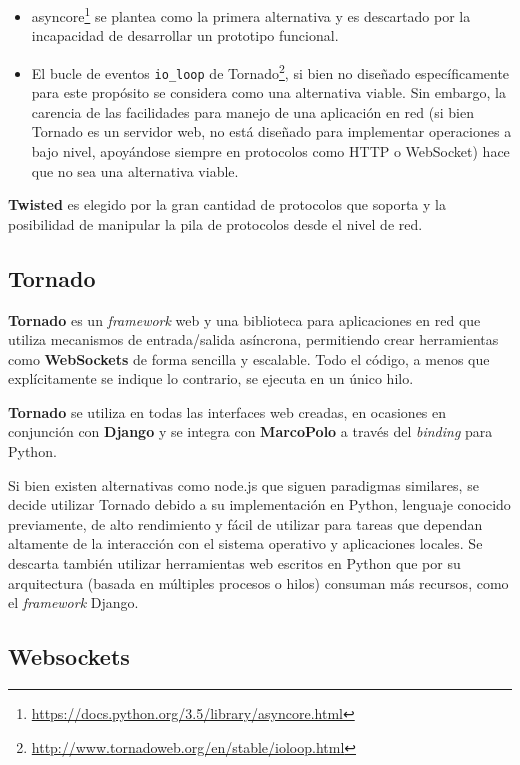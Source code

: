 \begin{itemize}
\item asyncore\footnote{\href{https://docs.python.org/3.5/library/asyncore.html}{https://docs.python.org/3.5/library/asyncore.html}} se plantea como la primera alternativa y es descartado por la incapacidad de desarrollar un prototipo funcional.
\item El bucle de eventos \texttt{io\_loop} de Tornado\footnote{\href{http://www.tornadoweb.org/en/stable/ioloop.html}{http://www.tornadoweb.org/en/stable/ioloop.html}}, si bien no diseñado específicamente para este propósito se considera como una alternativa viable. Sin embargo, la carencia de las facilidades para manejo de una aplicación en red (si bien Tornado es un servidor web, no está diseñado para implementar operaciones a bajo nivel, apoyándose siempre en protocolos como HTTP o WebSocket) hace que no sea una alternativa viable.
\end{itemize}

\textbf{Twisted} es elegido por la gran cantidad de protocolos que soporta y la posibilidad de manipular la pila de protocolos desde el nivel de red.

\subsection{Tornado}

\textbf{Tornado} es un \textit{framework} web y una biblioteca para aplicaciones en red que utiliza mecanismos de entrada/salida asíncrona, permitiendo crear herramientas como \textbf{WebSockets} de forma sencilla y escalable. Todo el código, a menos que explícitamente se indique lo contrario, se ejecuta en un único hilo.

\textbf{Tornado} se utiliza en todas las interfaces web creadas, en ocasiones en conjunción con \textbf{Django} y se integra con \textbf{MarcoPolo} a través del \textit{binding} para Python.

Si bien existen alternativas como node.js que siguen paradigmas similares, se decide utilizar Tornado debido a su implementación en Python, lenguaje conocido previamente, de alto rendimiento y fácil de utilizar para tareas que dependan altamente de la interacción con el sistema operativo y aplicaciones locales. Se descarta también utilizar herramientas web escritos en Python que por su arquitectura (basada en múltiples procesos o hilos) consuman más recursos, como el \textit{framework} Django.

\subsection{Websockets}

